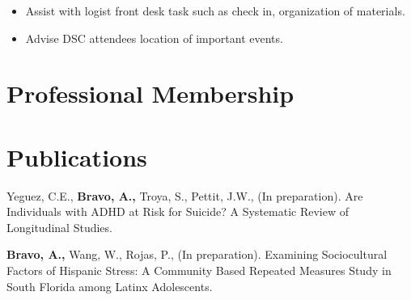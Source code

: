 \documentclass[11pt,a4paper,]{awesome-cv}
\begin{document}
\begin{cventries}
{\begin{cvitems}
\begin{itemize}
    \item Assist with logist front desk task such as check in, organization of materials.
    \item Advise DSC attendees location of important events.
  \end{itemize}
\end{cvitems}}
\end{cventries}

\hypertarget{professional-membership}{%
\section{Professional Membership}\label{professional-membership}}

\begin{cventries}
    \vspace{-4.0mm}
    \vspace{-4.0mm}
    \vspace{-4.0mm}
\end{cventries}

\hypertarget{publications}{%
\section{Publications}\label{publications}}

Yeguez, C.E., \textbf{Bravo, A.,} Troya, S., Pettit, J.W., (In
preparation). Are Individuals with ADHD at Risk for Suicide? A
Systematic Review of Longitudinal Studies.

\textbf{Bravo, A.,} Wang, W., Rojas, P., (In preparation). Examining
Sociocultural Factors of Hispanic Stress: A Community Based Repeated
Measures Study in South Florida among Latinx Adolescents.


\label{LastPage}~
\end{document}
